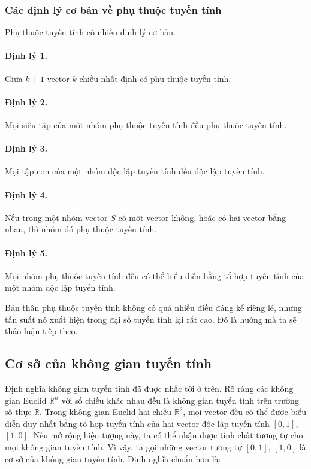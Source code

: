 \documentclass[11pt]{article}
\begin{document}
\subsubsection{Các định lý cơ bản về phụ thuộc tuyến tính}

Phụ thuộc tuyến tính có nhiều định lý cơ bản.

\paragraph{Định lý 1.}
Giữa \(k+1\) vector \(k\) chiều nhất định có phụ thuộc tuyến tính.

\paragraph{Định lý 2.}
Mọi siêu tập của một nhóm phụ thuộc tuyến tính đều phụ thuộc tuyến tính.

\paragraph{Định lý 3.}
Mọi tập con của một nhóm độc lập tuyến tính đều độc lập tuyến tính.

\paragraph{Định lý 4.}
Nếu trong một nhóm vector \(S\) có một vector không, hoặc có hai vector bằng
nhau, thì nhóm đó phụ thuộc tuyến tính.

\paragraph{Định lý 5.}
Mọi nhóm phụ thuộc tuyến tính đều có thể biểu diễn bằng tổ hợp tuyến tính của
một nhóm độc lập tuyến tính.

Bản thân phụ thuộc tuyến tính không có quá nhiều điều đáng kể riêng lẻ, nhưng
tần suất nó xuất hiện trong đại số tuyến tính lại rất cao. Đó là hướng mà ta sẽ
thảo luận tiếp theo.

\subsection{Cơ sở của không gian tuyến tính}

Định nghĩa không gian tuyến tính đã được nhắc tới ở trên. Rõ ràng các không gian
Euclid \(\mathbb{R}^n\) với số chiều khác nhau đều là không gian tuyến tính trên
trường số thực \(\mathbb{R}\). Trong không gian Euclid hai chiều
\(\mathbb{R}^2\), mọi vector đều có thể được biểu diễn duy nhất bằng tổ hợp
tuyến tính của hai vector độc lập tuyến tính \([0,1]\), \([1,0]\). Nếu mở rộng
hiện tượng này, ta có thể nhận được tính chất tương tự cho mọi không gian tuyến
tính. Vì vậy, ta gọi những vector tương tự \([0,1]\), \([1,0]\) là cơ sở của
không gian tuyến tính. Định nghĩa chuẩn hơn là:
\end{document}

